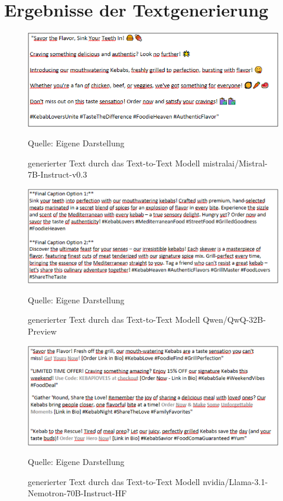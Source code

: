 \section{Ergebnisse der Textgenerierung}\label{sec:bilder-textergebnisse}

\begin{figure}[htbp]
    \centering
    \includegraphics[width=\textwidth]{abbildungen/textresult_mistral}
    \caption{generierter Text durch das Text-to-Text Modell mistralai/Mistral-7B-Instruct-v0.3}
    \label{fig:textresult_mistral}
    \raggedright Quelle: Eigene Darstellung
\end{figure}

\begin{figure}[htbp]
    \centering
    \includegraphics[width=\textwidth]{abbildungen/textresult_Qwen}
    \caption{generierter Text durch das Text-to-Text Modell Qwen/QwQ-32B-Preview}
    \label{fig:textresult_Qwen}
    \raggedright Quelle: Eigene Darstellung
\end{figure}

\begin{figure}[htbp]
    \centering
    \includegraphics[width=\textwidth]{abbildungen/textresult_nvdia_nemotron}
    \caption{generierter Text durch das Text-to-Text Modell nvidia/Llama-3.1-Nemotron-70B-Instruct-HF}
    \label{fig:textresult_nvdia_nemotron}
    \raggedright Quelle: Eigene Darstellung
\end{figure}
